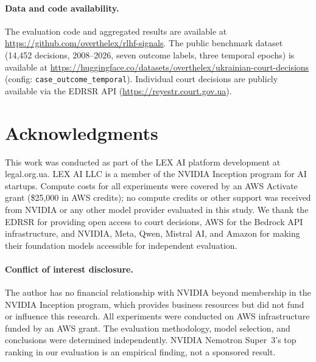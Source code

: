 \documentclass[11pt,a4paper]{article}
\begin{document}
\paragraph{Data and code availability.} The evaluation code and aggregated results are available at \url{https://github.com/overthelex/rlhf-signals}. The public benchmark dataset (14,452 decisions, 2008--2026, seven outcome labels, three temporal epochs) is available at \url{https://huggingface.co/datasets/overthelex/ukrainian-court-decisions} (config: \texttt{case\_outcome\_temporal}). Individual court decisions are publicly available via the EDRSR API (\url{https://reyestr.court.gov.ua}).

\section*{Acknowledgments}

This work was conducted as part of the LEX AI platform development at legal.org.ua. LEX AI LLC is a member of the NVIDIA Inception program for AI startups. Compute costs for all experiments were covered by an AWS Activate grant (\$25,000 in AWS credits); no compute credits or other support was received from NVIDIA or any other model provider evaluated in this study. We thank the EDRSR for providing open access to court decisions, AWS for the Bedrock API infrastructure, and NVIDIA, Meta, Qwen, Mistral AI, and Amazon for making their foundation models accessible for independent evaluation.

\paragraph{Conflict of interest disclosure.} The author has no financial relationship with NVIDIA beyond membership in the NVIDIA Inception program, which provides business resources but did not fund or influence this research. All experiments were conducted on AWS infrastructure funded by an AWS grant. The evaluation methodology, model selection, and conclusions were determined independently. NVIDIA Nemotron Super~3's top ranking in our evaluation is an empirical finding, not a sponsored result.
\end{document}
